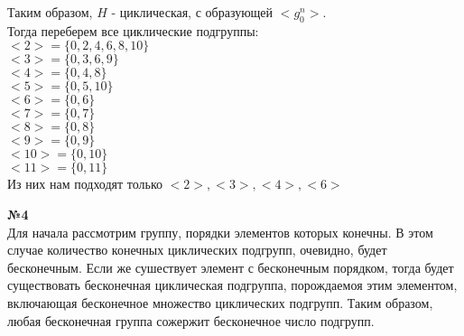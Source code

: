 \documentclass[a4paper, 12pt]{article}
\begin{document}
	Таким образом, $H$ - циклическая, с образующей $<g_0^n>$.\\
	
	Тогда переберем все циклические подгруппы: \\
	$<2> = \{0, 2, 4, 6, 8, 10\}$ \\
	$<3> = \{0, 3, 6, 9\}$ \\
	$<4> = \{0, 4, 8\}$ \\
	$<5> = \{0, 5, 10\}$ \\
	$<6> = \{0, 6\}$ \\
	$<7> = \{0, 7\}$ \\
	$<8> = \{0, 8\}$ \\
	$<9> = \{0, 9\}$ \\
	$<10> = \{0, 10\}$ \\
	$<11> = \{0, 11\}$ \\
	
	Из них нам подходят только $<2>, <3>, <4>, <6>$
	\newline
	
	\textbf{№4} \\
	
	Для начала рассмотрим группу, порядки элементов которых конечны. В этом случае количество конечных циклических подгрупп, очевидно, будет бесконечным. Если же сушествует элемент с бесконечным порядком, тогда будет существовать бесконечная циклическая подгруппа, порождаемоя этим элементом, включающая бесконечное множество циклических подгрупп. Таким образом, любая бесконечная группа сожержит бесконечное число подгрупп.
	
\end{document}
